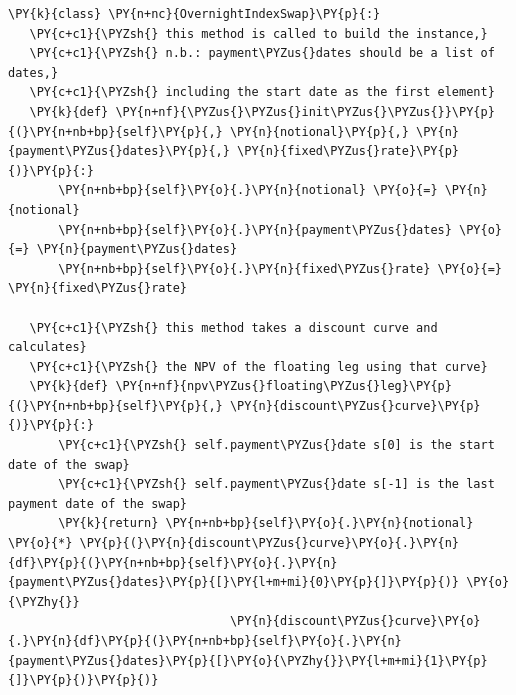 \begin{tcolorbox}[breakable, size=fbox, boxrule=1pt, pad at break*=1mm,colback=cellbackground, colframe=cellborder]
\begin{Verbatim}[commandchars=\\\{\}]
\PY{k}{class} \PY{n+nc}{OvernightIndexSwap}\PY{p}{:}        
   \PY{c+c1}{\PYZsh{} this method is called to build the instance,}
   \PY{c+c1}{\PYZsh{} n.b.: payment\PYZus{}dates should be a list of dates,}
   \PY{c+c1}{\PYZsh{} including the start date as the first element}
   \PY{k}{def} \PY{n+nf}{\PYZus{}\PYZus{}init\PYZus{}\PYZus{}}\PY{p}{(}\PY{n+nb+bp}{self}\PY{p}{,} \PY{n}{notional}\PY{p}{,} \PY{n}{payment\PYZus{}dates}\PY{p}{,} \PY{n}{fixed\PYZus{}rate}\PY{p}{)}\PY{p}{:}
       \PY{n+nb+bp}{self}\PY{o}{.}\PY{n}{notional} \PY{o}{=} \PY{n}{notional}
       \PY{n+nb+bp}{self}\PY{o}{.}\PY{n}{payment\PYZus{}dates} \PY{o}{=} \PY{n}{payment\PYZus{}dates}
       \PY{n+nb+bp}{self}\PY{o}{.}\PY{n}{fixed\PYZus{}rate} \PY{o}{=} \PY{n}{fixed\PYZus{}rate}
       
   \PY{c+c1}{\PYZsh{} this method takes a discount curve and calculates}
   \PY{c+c1}{\PYZsh{} the NPV of the floating leg using that curve}
   \PY{k}{def} \PY{n+nf}{npv\PYZus{}floating\PYZus{}leg}\PY{p}{(}\PY{n+nb+bp}{self}\PY{p}{,} \PY{n}{discount\PYZus{}curve}\PY{p}{)}\PY{p}{:}
       \PY{c+c1}{\PYZsh{} self.payment\PYZus{}date s[0] is the start date of the swap}
       \PY{c+c1}{\PYZsh{} self.payment\PYZus{}date s[-1] is the last payment date of the swap}
       \PY{k}{return} \PY{n+nb+bp}{self}\PY{o}{.}\PY{n}{notional} \PY{o}{*} \PY{p}{(}\PY{n}{discount\PYZus{}curve}\PY{o}{.}\PY{n}{df}\PY{p}{(}\PY{n+nb+bp}{self}\PY{o}{.}\PY{n}{payment\PYZus{}dates}\PY{p}{[}\PY{l+m+mi}{0}\PY{p}{]}\PY{p}{)} \PY{o}{\PYZhy{}} 
                               \PY{n}{discount\PYZus{}curve}\PY{o}{.}\PY{n}{df}\PY{p}{(}\PY{n+nb+bp}{self}\PY{o}{.}\PY{n}{payment\PYZus{}dates}\PY{p}{[}\PY{o}{\PYZhy{}}\PY{l+m+mi}{1}\PY{p}{]}\PY{p}{)}\PY{p}{)}
   

\end{Verbatim}
\end{tcolorbox}

